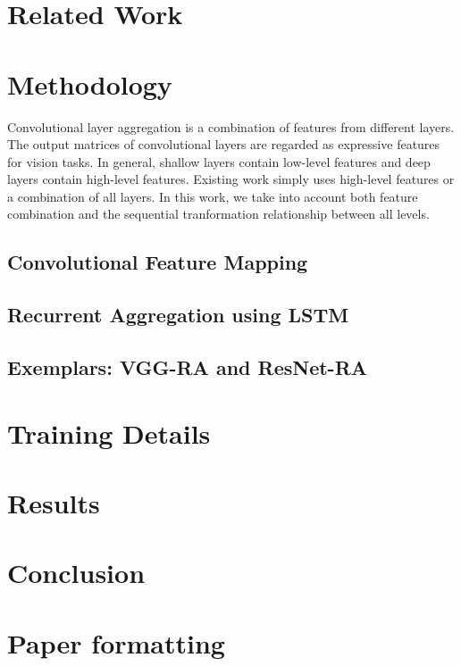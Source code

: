 \documentclass[runningheads]{llncs}
\begin{document}


\section{Related Work}

\section{Methodology}
Convolutional layer aggregation is a combination of features from different layers. The output matrices of convolutional layers are regarded as expressive features for vision tasks. In general, shallow layers contain low-level features and deep layers contain high-level features. Existing work simply uses high-level features or a combination of all layers. In this work, we take into account both feature combination and the sequential tranformation relationship between all levels.
\subsection{Convolutional Feature Mapping}
\subsection{Recurrent Aggregation using LSTM}
\subsection{Exemplars: VGG-RA and ResNet-RA}

\section{Training Details}

\section{Results}

\section{Conclusion}

\section{Paper formatting}
\end{document}
